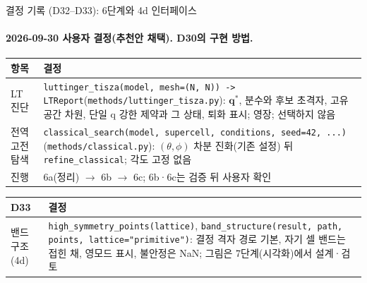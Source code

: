 \begin{frame}[label=decisions-d32]{결정 기록 (D32--D33): 6단계와 4d 인터페이스}
  \framesubtitle{2026-09-30 사용자 결정(추천안 채택). D30의 구현 방법.}
  \small\renewcommand{\arraystretch}{1.12}
  \begin{tabularx}{\textwidth}{@{}P{3.0cm}Y@{}}
    \toprule
    항목 & 결정 \\
    \midrule
    LT 진단 & \texttt{luttinger\_tisza(model, mesh=(N, N)) -> LTReport}(\texttt{methods/luttinger\_tisza.py}): $\mathbf q^*$, 분수와 후보 초격자, 고유공간 차원, 단일 q 강한 제약과 그 상태, 퇴화 표시; 영장; 선택하지 않음 \\
    전역 고전 탐색 & \texttt{classical\_search(model, supercell, conditions, seed=42, ...)}(\texttt{methods/classical.py}): $(\theta,\phi)$ 차분 진화(기존 설정) 뒤 \texttt{refine\_classical}; 각도 고정 없음 \\
    진행 & 6a(정리) $\to$ 6b $\to$ 6c; 6b·6c는 검증 뒤 사용자 확인 \\
    \bottomrule
  \end{tabularx}
  \par\medskip
  \begin{tabularx}{\textwidth}{@{}P{3.0cm}Y@{}}
    \toprule
    D33 & 결정 \\
    \midrule
    밴드 구조(4d) & \texttt{high\_symmetry\_points(lattice)}, \texttt{band\_structure(result, path, points, lattice="primitive")}: 결정 격자 경로 기본, 자기 셀 밴드는 접힌 채, 영모드 표시, 불안정은 NaN; 그림은 7단계(시각화)에서 설계·검토 \\
    \bottomrule
  \end{tabularx}
\end{frame}

